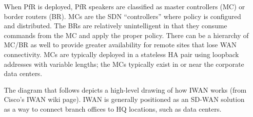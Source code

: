 When PfR is deployed, PfR speakers are classified as master controllers (MC)
or border routers (BR). MCs are the SDN ``controllers'' where policy is
configured and distributed. The BRs are relatively unintelligent in that they
consume commands from the MC and apply the proper policy. There can be a
hierarchy of MC/BR as well to provide greater availability for remote sites
that lose WAN connectivity. MCs are typically deployed in a stateless HA pair
using loopback addresses with variable lengths; the MCs typically exist in or
near the corporate data centers.

The diagram that follows depicts a high-level drawing of how IWAN works (from
Cisco’s IWAN wiki page). IWAN is generally positioned as an SD-WAN solution as
a way to connect branch offices to HQ locations, such as data centers.

